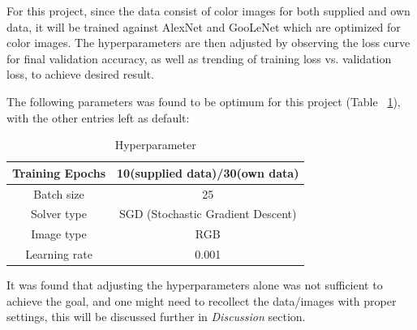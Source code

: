 \documentclass[10pt,journal,compsoc]{IEEEtran}
\begin{document}
For this project, since the data consist of color images for both supplied and own data, it will be trained against AlexNet and GooLeNet which are optimized for color images. The hyperparameters are then adjusted by observing the loss curve for final validation accuracy, as well as trending of training loss vs. validation loss, to achieve desired result.\linebreak

The following parameters was found to be optimum for this project (Table ~\ref{hyperparameter}), with the other entries left as default:


\begin{table}[!htbp]
\caption{Hyperparameter}
\label{hyperparameter}
\begin{center}
\begin{tabular}{|c||c|}
\hline
Training Epochs & 10(supplied data)/30(own data)\\
\hline
Batch size & 25\\
\hline
Solver type & SGD (Stochastic Gradient Descent)\\
\hline
Image type & RGB\\
\hline
Learning rate & 0.001\\
\hline
\end{tabular}
\end{center}
\end{table}


It was found that adjusting the hyperparameters alone was not sufficient to achieve the goal, and one might need to recollect the data/images with proper settings, this will be discussed further in \textit{Discussion} section.

\end{document}
